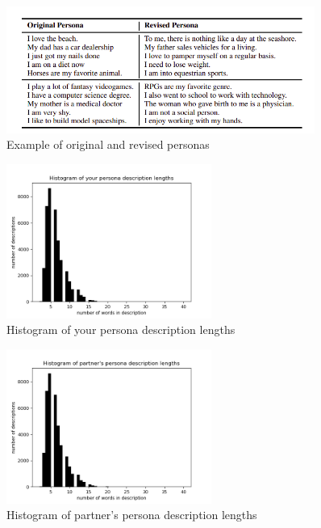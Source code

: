 \begin{figure}[hbt]
  \centering
  \includegraphics[width=0.9\textwidth]{figures/persona.png}
  \caption{Example of original and revised personas \cite{persona_chat}}
  \label{revised_persona}
\end{figure}

\begin{figure}[hbt]
  \centering
  \includegraphics[width=0.6\textwidth]{figures/persona_desc.png}
  \caption{Histogram of your persona description lengths}
  \label{histogram_persona_desc}
\end{figure}

\begin{figure}[hbt]
  \centering
  \includegraphics[width=0.6\textwidth]{figures/partner_desc.png}
  \caption{Histogram of partner's persona description lengths}
  \label{histogram_partner_desc}
\end{figure}

